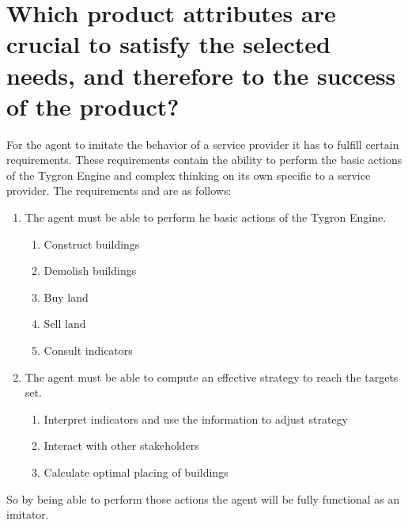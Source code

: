 \section{Which product attributes are crucial to satisfy the selected needs, and therefore to the success of the product?}

For the agent to imitate the behavior of a service provider it has to fulfill certain requirements. These requirements contain the ability to perform the basic actions of the Tygron Engine and complex thinking on its own specific to a service provider. The requirements and are as follows:
\begin{enumerate}
\item The agent must be able to perform he basic actions of the Tygron Engine.
	\begin{enumerate}
	\item Construct buildings
	\item Demolish buildings
	\item Buy land
	\item Sell land
	\item Consult indicators
	\end{enumerate}

\item The agent must be able to compute an effective strategy to reach the targets set.
	\begin{enumerate}
	\item Interpret indicators and use the information to adjust strategy
	\item Interact with other stakeholders
	\item Calculate optimal placing of buildings
	\end{enumerate}

\end{enumerate} 

So by being able to perform those actions the agent will be fully functional as an imitator.
